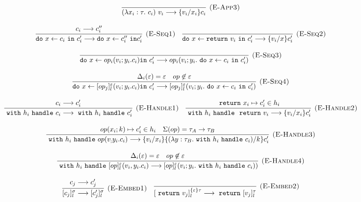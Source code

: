 \documentclass{article}
\theoremstyle{definition}
\newcommand{\m}[1]{\ \texttt{#1}\ }
\begin{document}
\begin{figure}[H]
{\[\begin{array}{c}
\infer[\textsc{(E-App3)}]
  {(\lambda x_i:\tau.\ c_i) \ v_i \longrightarrow \{v_i/x_i\}c_i}
  {} \\[3ex]
  
  
\infer[\textsc{(E-Seq1)}]
  {\texttt{do}\ x \leftarrow c_i\ \texttt{in}\ c_i' \longrightarrow \texttt{do}\ x \leftarrow c_i''\ \texttt{in} c_i'}
  {c_i \longrightarrow c_i''}  \quad
  
\infer[\textsc{(E-Seq2)}]
  {\texttt{do}\ x \leftarrow \texttt{return}\ v_i \ \texttt{in}\ c_i' \longrightarrow \{v_i/x\} c_i'}
  {} \\[3ex]
  
\infer[\textsc{(E-Seq3)}]
  {\texttt{do}\ x \leftarrow op_i(v_i; y_i.c_i) \texttt{in}\ c_i' \longrightarrow op_i(v_i; y_i. \m{do} x \leftarrow c_i \m{in} c_i')}
  {} \\[3ex]
  
\infer[\textsc{(E-Seq4)}]
  {\texttt{do}\ x \leftarrow [op_j]^\varepsilon_l(v_i; y_i.c_i) \texttt{in}\ c_i' \longrightarrow [op_j]^\varepsilon_l(v_i; y_i. \m{do} x \leftarrow c_i \m{in} c_i')}
  {\Delta_i(\varepsilon) = \varepsilon & op \not \in \varepsilon} \\[3ex]
  

  
 \infer[\textsc{(E-Handle1)}]
  {\m{with} h_i \m{handle} c_i \longrightarrow \m{with} h_i \m{handle} c_i' }
  {c_i \longrightarrow c_i'} \quad
  
\infer[\textsc{(E-Handle2)}]
  {\m{with} h_i \m{handle} \m{return} v_i \longrightarrow \{v_i/x_i\}c_i' }
  {\m{return} x_i \mapsto	c_i' \in h_i} \\[3ex]
  
\infer[\textsc{(E-Handle3)}]
  {\m{with} h_i \m{handle} op(v_; y_i.c_i) \longrightarrow \{v_i/x_i\} \{(\lambda y: \tau_B.
   \m{with} h_i\m{handle} c_i) / k\}c_i' }
  {op(x_i; k) \mapsto c_i' \in h_i & \Sigma(op) = \tau_A \rightarrow \tau_B} \\[3ex]
  
\infer[\textsc{(E-Handle4)}]
  {\m{with} h_i \m{handle} [op]^\varepsilon_l(v_i, y_i.c_i) \longrightarrow [op]^\varepsilon_l(v_i; y_i. \m{with} h_i \m{handle} c_i))}
  {\Delta_i(\varepsilon) = \varepsilon & op \not \in \varepsilon} \\[3ex]
  
\infer[\textsc{(E-Embed1)}]
{[c_j]^\sigma_l \longrightarrow [c_j']^\sigma_l}
{c_j \longrightarrow c_j'} \quad 



\infer[\textsc{(E-Embed2)}]
{[\m{return} v_j]^{\{\varepsilon\}\tau}_l \longrightarrow \m{return} [v_j]^\tau_l}
{} \\[3ex]


\end{array}\]}
\end{figure}
\end{document}
